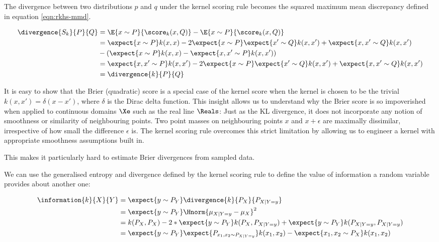 The divergence between two distributions $p$ and $q$ under the kernel scoring rule becomes the squared maximum mean discrepancy defined in equation \eqref{eqn:rkhs-mmd}.

\begin{align}
	\divergence{S_k}{P}{Q} &= \E{x\sim P}{\score_{k}(x,Q)} - \E{x\sim P}{\score_k(x,Q)}\\ 
		&= \expect{x\sim P} k(x,x) - 2 \expect{x\sim P}\expect{x' \sim Q} k(x,x') + \expect{x,x'\sim Q} k(x,x')\\
		&- \left( \expect{x \sim P} k(x,x) - \expect{x,x'\sim P} k(x,x') \right)\\
		&=  \expect{x,x'\sim P} k(x,x')	- 2 \expect{x\sim P}\expect{x'\sim Q} k(x,x') + \expect{x,x'\sim Q} k(x,x')\\
		&= \divergence{k}{P}{Q}
\end{align}

It is easy to show that the Brier (quadratic) score is a special case of the kernel score when the kernel is chosen to be the trivial $k(x,x') = \delta(x - x')$, where $\delta$ is the Dirac delta function. This insight allows us to understand why the Brier score is so impoverished when applied to continuous domains $\Xe$ such as the real line $\Reals$: Just as the KL divergence, it does not incorporate any notion of smoothness or similarity of neighbouring points. Two point masses on neighbouring points $x$ and $x+\epsilon$ are maximally dissimilar, irrespective of how small the difference $\epsilon$ is. The kernel scoring rule overcomes this strict limitation by allowing us to engineer a kernel with appropriate smoothness assumptions built in.

 This makes it particularly hard to estimate Brier divergences from sampled data.


We can use the generalised entropy and divergence defined by the kernel scoring rule to define the value of information a random variable provides about another one:

\begin{align}
	\information{k}{X}{Y} &= \expect{y\sim P_{Y}} \divergence{k}{P_{X}}{P_{X\vert Y=y}}\\
		&=  \expect{y\sim P_{Y}} \Hnorm{ \mu_{X \vert Y=y} - \mu_X }^2 \label{eqn:kernel_information}\\
		&= k(P_{X},P_{X}) - 2*\expect{y\sim P_{Y}}k(P_{X},P_{X\vert Y=y}) + \expect{y\sim P_{Y}} k(P_{X\vert Y=y},P_{X\vert Y=y})\\
		&= \expect{y\sim P_{Y}} \expect{P_{x_1,x_2 \sim P_{X\vert Y=y}}}k(x_1,x_2) - \expect{x_1,x_2\sim P_{X}}k(x_1,x_2)
\end{align}

